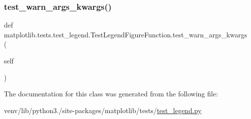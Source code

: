 \subsubsection{\texorpdfstring{test\+\_\+warn\+\_\+args\+\_\+kwargs()}{test\_warn\_args\_kwargs()}}
{\footnotesize\ttfamily def matplotlib.\+tests.\+test\+\_\+legend.\+Test\+Legend\+Figure\+Function.\+test\+\_\+warn\+\_\+args\+\_\+kwargs (\begin{DoxyParamCaption}\item[{}]{self }\end{DoxyParamCaption})}



The documentation for this class was generated from the following file\+:\begin{DoxyCompactItemize}
\item 
venv/lib/python3./site-\/packages/matplotlib/tests/\hyperlink{test__legend_8py}{test\+\_\+legend.\+py}\end{DoxyCompactItemize}
